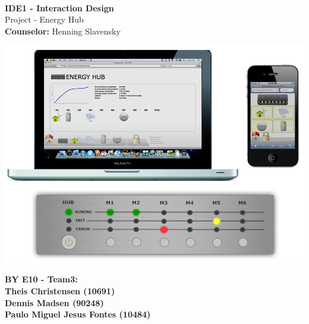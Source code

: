 
\begin{centering}
\thispagestyle{empty} %
\begin{center}
\textbf{\Huge {\\IDE1 - Interaction Design}}\\
\huge {Project - Energy Hub}\\ \vspace{0.5cm}
\large{\textbf{Counselor:} Henning Slavensky}\\ \vspace{0.7cm}
\end{center}

\centering
\includegraphics[width=1.0\textwidth]{images/frontpage.png}
 \end{centering}
\begin{center}
\vspace{0.4cm}
\Large{\textbf{BY E10 - Team3: \\ \vspace{0.3cm}Theis Christensen (10691)\\ \vspace{0.7cm}Dennis Madsen (90248)\\  \vspace{0.7cm}Paulo Miguel Jesus Fontes (10484)}}
\end{center}
